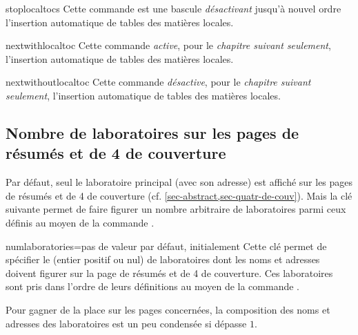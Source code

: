 \begin{docCommand}[doc new=2016-09-29]{stoplocaltocs}{}
  Cette commande est une bascule \emph{désactivant} jusqu'à nouvel ordre
  l'insertion automatique de tables des matières locales.
\end{docCommand}

\begin{docCommand}[doc new=2016-09-29]{nextwithlocaltoc}{}
  Cette commande \emph{active}, pour le \emph{chapitre suivant seulement},
  l'insertion automatique de tables des matières locales.
\end{docCommand}

\begin{docCommand}[doc new=2016-09-29]{nextwithoutlocaltoc}{}
  Cette commande \emph{désactive}, pour le \emph{chapitre suivant seulement},
  l'insertion automatique de tables des matières locales.
\end{docCommand}

\subsection{Nombre de laboratoires sur les pages de résumés et de 4\ieme{} de couverture}
\label{sec-nombre-de-labor}

Par défaut, seul le laboratoire principal (avec son adresse) est affiché sur
les pages de résumés et de 4\ieme{} de couverture
(cf. \vref{sec-abstract,sec-quatr-de-couv}). Mais la clé
 suivante permet de faire figurer un nombre arbitraire
de laboratoires parmi ceux définis au moyen de la commande
.%

\begin{docKey}{numlaboratories}{=}{pas de valeur par
    défaut, initialement }
  Cette clé permet de spécifier le  (entier positif ou nul) de
  laboratoires dont les noms et adresses doivent figurer sur la page de résumés
  et de 4\ieme{} de couverture. Ces laboratoires sont pris dans l'ordre de
  leurs définitions au moyen de la commande .
\end{docKey}

Pour gagner de la place sur les pages concernées, la composition des noms et
adresses des laboratoires est un peu condensée si  dépasse $1$.

